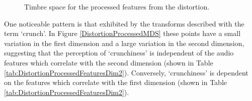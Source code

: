 		\begin{figure}[h!]
			\centering
			\qquad
			\caption{Timbre space for the processed features from the distortion.}
			\label{fig:DistortionProcessedMDSs}
		\end{figure}

		One noticeable pattern is that exhibited by the transforms described with the term `crunch'. In Figure
		\ref{DistortionProcessedMDS} these points have a small variation in the first dimension and a large
		variation in the second dimension, suggesting that the perception of `crunchiness' is independent of the
		audio features which correlate with the second dimension (shown in Table
		\ref{tab:DistortionProcessedFeaturesDim2}). Conversely, `crunchiness' is dependent on the features which
		correlate with the first dimension (shown in Table \ref{tab:DistortionProcessedFeaturesDim2}).


